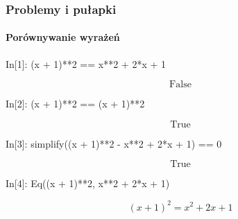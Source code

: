 \documentclass[10pt]{beamer}
\begin{document}
\begin{frame}[fragile]
  \frametitle{Problemy i pułapki}
  \framesubtitle{Porównywanie wyrażeń}

  \begin{python}
    In[1]: (x + 1)**2 == x**2 + 2*x + 1
  \end{python}
  \begin{equation*}
    \mathrm{False}
  \end{equation*}

  \begin{python}
    In[2]: (x + 1)**2 == (x + 1)**2
  \end{python}
  \begin{equation*}
    \mathrm{True}
  \end{equation*}

  \begin{python}
    In[3]: simplify((x + 1)**2 - x**2 + 2*x + 1) == 0
  \end{python}
  \begin{equation*}
    \mathrm{True}
  \end{equation*}

  \pause

  \begin{python}
    In[4]: Eq((x + 1)**2, x**2 + 2*x + 1)
  \end{python}
  \begin{equation*}
    \left(x + 1\right)^{2} = x^{2} + 2 x + 1
  \end{equation*}


\end{frame}
\end{document}

